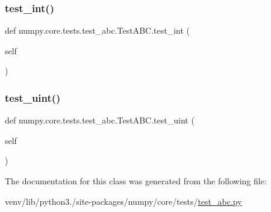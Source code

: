 \subsubsection{\texorpdfstring{test\+\_\+int()}{test\_int()}}
{\footnotesize\ttfamily def numpy.\+core.\+tests.\+test\+\_\+abc.\+Test\+A\+B\+C.\+test\+\_\+int (\begin{DoxyParamCaption}\item[{}]{self }\end{DoxyParamCaption})}

\mbox{\label{classnumpy_1_1core_1_1tests_1_1test__abc_1_1TestABC_adfea59a93223771a2125c23095f6d55a}} 
\subsubsection{\texorpdfstring{test\+\_\+uint()}{test\_uint()}}
{\footnotesize\ttfamily def numpy.\+core.\+tests.\+test\+\_\+abc.\+Test\+A\+B\+C.\+test\+\_\+uint (\begin{DoxyParamCaption}\item[{}]{self }\end{DoxyParamCaption})}



The documentation for this class was generated from the following file\+:\begin{DoxyCompactItemize}
\item 
venv/lib/python3./site-\/packages/numpy/core/tests/\hyperlink{test__abc_8py}{test\+\_\+abc.\+py}\end{DoxyCompactItemize}
